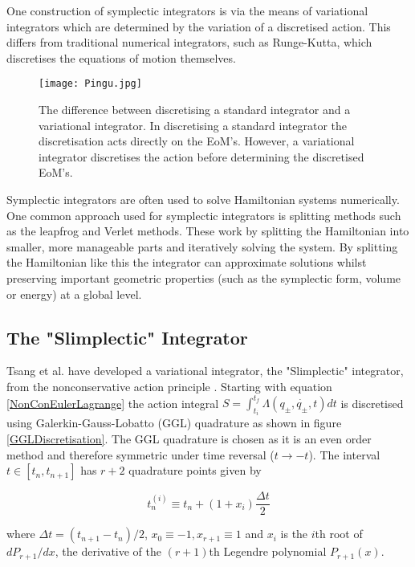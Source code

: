 \documentclass[10pt]{iopart}
\begin{document}
One construction of symplectic integrators is via the means of variational integrators which are determined by the variation of a discretised action. This differs from traditional numerical integrators, such as Runge-Kutta, which discretises the equations of motion themselves. 


\begin{figure}
	\label{VariationalIntegrator}
	\centering
	\texttt{[image: Pingu.jpg]}
	\caption{The difference between discretising a standard integrator and a variational integrator. In discretising a standard integrator the discretisation acts directly on the EoM's. However, a variational integrator discretises the action before determining the discretised EoM's.}
\end{figure}

Symplectic integrators are often used to solve Hamiltonian systems numerically. One common approach used for symplectic integrators is splitting methods such as the leapfrog and Verlet \cite{Verlet} methods. These work by splitting the Hamiltonian into smaller, more manageable parts and iteratively solving the system. By splitting the Hamiltonian like this the integrator can approximate solutions whilst preserving important geometric properties (such as the symplectic form, volume or energy) at a global level.

\subsection{The "Slimplectic" Integrator \\}
Tsang et al. \cite{Tsang_Slimplectic} have developed a variational integrator, the "Slimplectic" integrator, from the nonconservative action principle \cite{GalleyEtAl}. Starting with equation \ref{NonConEulerLagrange} the action integral $S = \int_{t_i}^{t_f}\Lambda(q_{\pm},\dot{q_{\pm}},t)dt$ is discretised using Galerkin-Gauss-Lobatto (GGL) quadrature \cite{GGL} as shown in figure \ref{GGLDiscretisation}. The GGL quadrature is chosen as it is an even order method and therefore symmetric under time reversal ($t\to-t$). The interval $t\in [t_n, t_{n+1}]$ has $r+2$ quadrature points given by

\begin{equation}
\label{timeDiscretisation}
	t_n^{(i)} \equiv t_n + (1+x_i)\frac{\Delta t}{2}
\end{equation}

where $\Delta t = (t_{n+1}-t_n)/2$, $x_0 \equiv -1, x_{r+1} \equiv 1$ and $x_i$ is the $i$th root of $dP_{r+1}/dx$, the derivative of the $(r+1)$th Legendre polynomial $P_{r+1}(x)$. 
\end{document}
